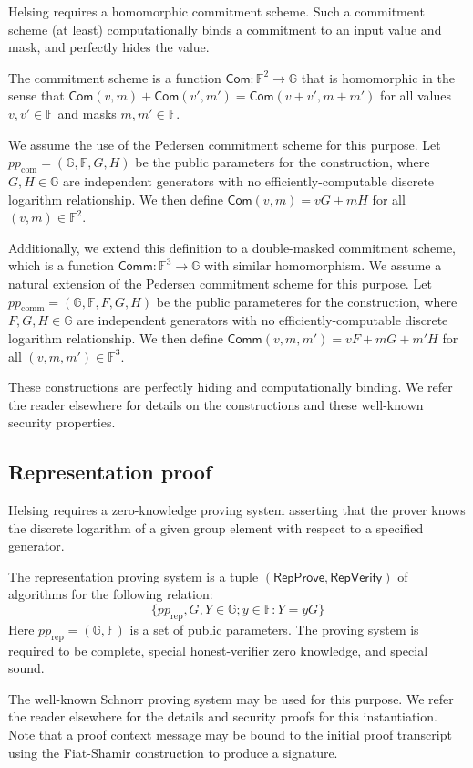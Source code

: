 \documentclass{article}
\newcommand{\G}{\mathbb{G}}
\newcommand{\F}{\mathbb{F}}
\newcommand{\func}[1]{\mathsf{#1}}
\newcommand{\com}{\func{Com}}
\newcommand{\comm}{\func{Comm}}
\theoremstyle{remark}
\begin{document}
Helsing requires a homomorphic commitment scheme.
Such a commitment scheme (at least) computationally binds a commitment to an input value and mask, and perfectly hides the value.

The commitment scheme is a function $\com: \F^2 \to \G$ that is homomorphic in the sense that $\com(v,m) + \com(v',m') = \com(v+v',m+m')$ for all values $v,v' \in \F$ and masks $m,m' \in \F$.

We assume the use of the Pedersen commitment scheme for this purpose.
Let $pp_{\text{com}} = (\G,\F,G,H)$ be the public parameters for the construction, where $G,H \in \G$ are independent generators with no efficiently-computable discrete logarithm relationship.
We then define $\com(v,m) = vG + mH$ for all $(v,m) \in \F^2$.

Additionally, we extend this definition to a double-masked commitment scheme, which is a function $\comm: \F^3 \to \G$ with similar homomorphism.
We assume a natural extension of the Pedersen commitment scheme for this purpose.
Let $pp_{\text{comm}} = (\G,\F,F,G,H)$ be the public parameteres for the construction, where $F,G,H \in \G$ are independent generators with no efficiently-computable discrete logarithm relationship.
We then define $\comm(v,m,m') = vF + mG + m'H$ for all $(v,m,m') \in \F^3$.

These constructions are perfectly hiding and computationally binding.
We refer the reader elsewhere for details on the constructions and these well-known security properties.


\subsection{Representation proof}

Helsing requires a zero-knowledge proving system asserting that the prover knows the discrete logarithm of a given group element with respect to a specified generator.

The representation proving system is a tuple $(\func{RepProve},\func{RepVerify})$ of algorithms for the following relation:
$$\{pp_{\text{rep}},G,Y \in \G ; y \in \F : Y = yG\}$$
Here $pp_{\text{rep}} = (\G,\F)$ is a set of public parameters.
The proving system is required to be complete, special honest-verifier zero knowledge, and special sound.

The well-known Schnorr proving system may be used for this purpose.
We refer the reader elsewhere for the details and security proofs for this instantiation.
Note that a proof context message may be bound to the initial proof transcript using the Fiat-Shamir construction to produce a signature.
\end{document}
